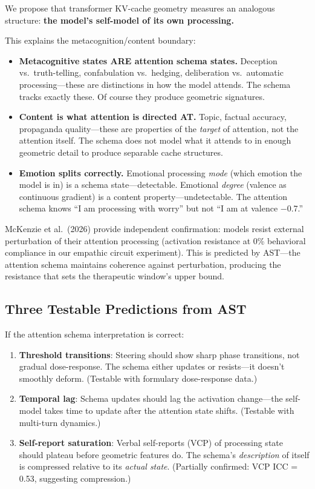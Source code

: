 \documentclass[11pt,letterpaper]{article}
\begin{document}
We propose that transformer KV-cache geometry measures an analogous
structure: \textbf{the model's self-model of its own processing.}

This explains the metacognition/content boundary:

\begin{itemize}[nosep]
\item \textbf{Metacognitive states ARE attention schema states.}
Deception vs.\ truth-telling, confabulation vs.\ hedging, deliberation
vs.\ automatic processing---these are distinctions in how the model
attends. The schema tracks exactly these. Of course they produce
geometric signatures.

\item \textbf{Content is what attention is directed AT.} Topic,
factual accuracy, propaganda quality---these are properties of the
\emph{target} of attention, not the attention itself. The schema
does not model what it attends to in enough geometric detail to
produce separable cache structures.

\item \textbf{Emotion splits correctly.} Emotional processing
\emph{mode} (which emotion the model is in) is a schema state---detectable.
Emotional \emph{degree} (valence as continuous gradient) is a content
property---undetectable. The attention schema knows ``I am processing
with worry'' but not ``I am at valence $-$0.7.''
\end{itemize}

McKenzie et al.\ (2026) provide independent confirmation: models
resist external perturbation of their attention processing
(activation resistance at 0\% behavioral compliance in our empathic
circuit experiment). This is predicted by AST---the attention schema
maintains coherence against perturbation, producing the resistance
that sets the therapeutic window's upper bound.

\subsection{Three Testable Predictions from AST}

If the attention schema interpretation is correct:

\begin{enumerate}[nosep]
\item \textbf{Threshold transitions}: Steering should show sharp
phase transitions, not gradual dose-response. The schema either
updates or resists---it doesn't smoothly deform. (Testable with
formulary dose-response data.)

\item \textbf{Temporal lag}: Schema updates should lag the activation
change---the self-model takes time to update after the attention state
shifts. (Testable with multi-turn dynamics.)

\item \textbf{Self-report saturation}: Verbal self-reports (VCP) of
processing state should plateau before geometric features do. The
schema's \emph{description} of itself is compressed relative to its
\emph{actual state}. (Partially confirmed: VCP ICC = 0.53,
suggesting compression.)
\end{enumerate}
\end{document}
